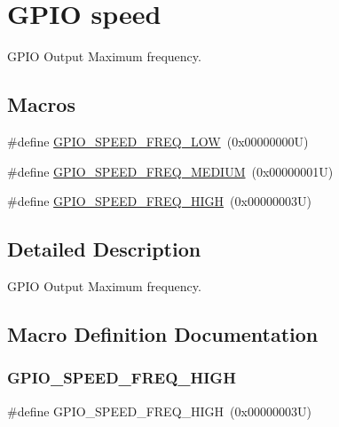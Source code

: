 \hypertarget{group___g_p_i_o__speed}{}\section{G\+P\+IO speed}
\label{group___g_p_i_o__speed}


G\+P\+IO Output Maximum frequency.  


\subsection*{Macros}
\begin{DoxyCompactItemize}
\item 
\#define \hyperlink{group___g_p_i_o__speed_gab7916c4265bfa1b26a5205ea9c1caa4e}{G\+P\+I\+O\+\_\+\+S\+P\+E\+E\+D\+\_\+\+F\+R\+E\+Q\+\_\+\+L\+OW}~(0x00000000\+U)
\item 
\#define \hyperlink{group___g_p_i_o__speed_ga1724a25a9cf00ebf485daeb09cfa1e25}{G\+P\+I\+O\+\_\+\+S\+P\+E\+E\+D\+\_\+\+F\+R\+E\+Q\+\_\+\+M\+E\+D\+I\+UM}~(0x00000001\+U)
\item 
\#define \hyperlink{group___g_p_i_o__speed_gaef5898db71cdb957cd41f940b0087af8}{G\+P\+I\+O\+\_\+\+S\+P\+E\+E\+D\+\_\+\+F\+R\+E\+Q\+\_\+\+H\+I\+GH}~(0x00000003\+U)
\end{DoxyCompactItemize}


\subsection{Detailed Description}
G\+P\+IO Output Maximum frequency. 



\subsection{Macro Definition Documentation}
\mbox{\label{group___g_p_i_o__speed_gaef5898db71cdb957cd41f940b0087af8}} 
\subsubsection{\texorpdfstring{G\+P\+I\+O\+\_\+\+S\+P\+E\+E\+D\+\_\+\+F\+R\+E\+Q\+\_\+\+H\+I\+GH}{GPIO\_SPEED\_FREQ\_HIGH}}
{\footnotesize\ttfamily \#define G\+P\+I\+O\+\_\+\+S\+P\+E\+E\+D\+\_\+\+F\+R\+E\+Q\+\_\+\+H\+I\+GH~(0x00000003\+U)}

